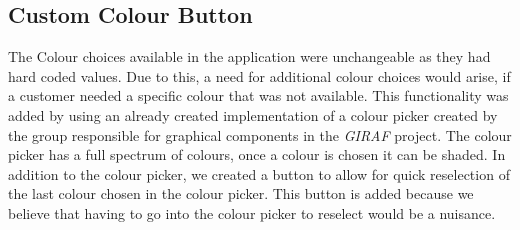 \subsection{Custom Colour Button}
The Colour choices available in the application were unchangeable as they had hard coded values.
Due to this, a need for additional colour choices would arise, if a customer needed a specific colour that was not available.
This functionality was added by using an already created implementation of a colour picker created by the group responsible for graphical components in the \textit{GIRAF} project. 
The colour picker has a full spectrum of colours, once a colour is chosen it can be shaded.
In addition to the colour picker, we created a button to allow for quick reselection of the last colour chosen in the colour picker.
This button is added because we believe that having to go into the colour picker to reselect would be a nuisance.